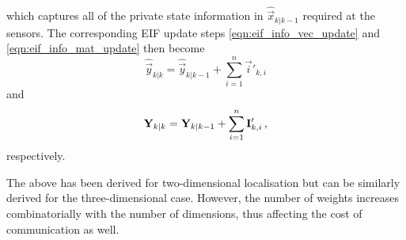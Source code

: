which captures all of the private state information in $\hat{\vec{x}}_{k|k-1}$ required at the sensors. The corresponding EIF update steps \eqref{eqn:eif_info_vec_update} and \eqref{eqn:eif_info_mat_update} then become
\begin{equation}
    \hat{\vec{y}}_{k|k} = \hat{\vec{y}}_{k|k-1} + \sum^n_{i=1}\vec{i}'_{k,i} \label{eqn:eif_modified_vec_update}
\end{equation}
and
\begin{equation}
    {\ensuremath{{\mathbf{Y}}}}_{k|k} = {{\mathbf{Y}}}_{k|k-1} + \sum^n_{i=1}{{\mathbf{I}}}'_{k,i}\,, \label{eqn:eif_modified_mat_update}
\end{equation}
respectively.
\begin{remark}
    The above has been derived for two-dimensional localisation but can be similarly derived for the three-dimensional case. However, the number of weights increases combinatorially with the number of dimensions, thus affecting the cost of communication as well.
\end{remark}

% 
% 

